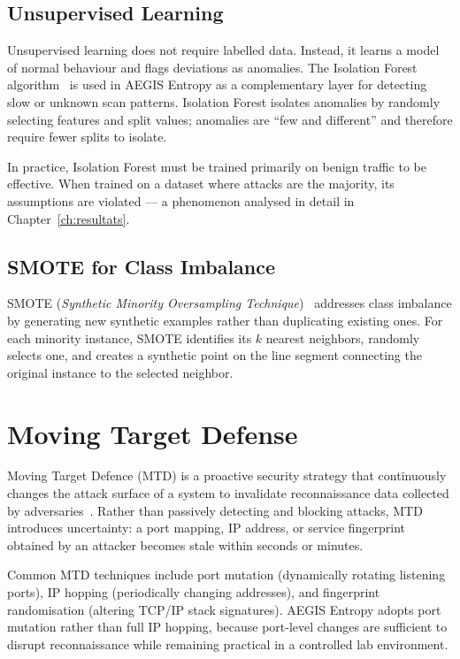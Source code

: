 \documentclass[12pt,a4paper]{report}
\begin{document}
\subsection{Unsupervised Learning}

Unsupervised learning does not require labelled data. Instead, it learns a model of normal behaviour and flags deviations as anomalies. The Isolation Forest algorithm~\cite{liu2008} is used in AEGIS Entropy as a complementary layer for detecting slow or unknown scan patterns. Isolation Forest isolates anomalies by randomly selecting features and split values; anomalies are ``few and different'' and therefore require fewer splits to isolate.

In practice, Isolation Forest must be trained primarily on benign traffic to be effective. When trained on a dataset where attacks are the majority, its assumptions are violated --- a phenomenon analysed in detail in Chapter~\ref{ch:resultats}.

\subsection{SMOTE for Class Imbalance}

SMOTE (\textit{Synthetic Minority Oversampling Technique})~\cite{chawla2002} addresses class imbalance by generating new synthetic examples rather than duplicating existing ones. For each minority instance, SMOTE identifies its $k$ nearest neighbors, randomly selects one, and creates a synthetic point on the line segment connecting the original instance to the selected neighbor.

\section{Moving Target Defense}

Moving Target Defence (MTD) is a proactive security strategy that continuously changes the attack surface of a system to invalidate reconnaissance data collected by adversaries~\cite{jajodia2011,nist2020}. Rather than passively detecting and blocking attacks, MTD introduces uncertainty: a port mapping, IP address, or service fingerprint obtained by an attacker becomes stale within seconds or minutes.

Common MTD techniques include port mutation (dynamically rotating listening ports), IP hopping (periodically changing addresses), and fingerprint randomisation (altering TCP/IP stack signatures). AEGIS Entropy adopts port mutation rather than full IP hopping, because port-level changes are sufficient to disrupt reconnaissance while remaining practical in a controlled lab environment.
\end{document}
